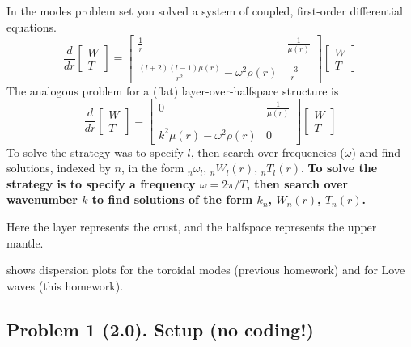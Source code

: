 \documentclass[11pt,titlepage,fleqn]{article}
\begin{document}
In the modes problem set you solved a system of coupled, first-order differential equations.
%
\begin{equation}
\frac{d}{dr}
\left[ \begin{array}{c} W \\ T \end{array} \right]
=
\left[ \begin{array}{cc}
\frac{1}{r} & \frac{1}{\mu(r)} \\
& \\
\frac{(l+2)(l-1)\mu(r)}{r^2} -\omega^2\rho(r)  & \frac{-3}{r}
\end{array} \right]
\left[ \begin{array}{c} W \\ T \end{array} \right]
\label{ODEs}
\end{equation}
%
The analogous problem for a (flat) layer-over-halfspace structure is
%
\begin{equation}
\frac{d}{dr}
\left[ \begin{array}{c} W \\ T \end{array} \right]
=
\left[ \begin{array}{cc}
0 & \frac{1}{\mu(r)} \\
& \\
k^2 \mu(r)-\omega^2\rho(r) & 0
\end{array} \right]
\left[ \begin{array}{c} W \\ T \end{array} \right]
\label{rODEs}
\end{equation}
%
To solve  the strategy was to specify $l$, then search over frequencies ($\omega$) and find solutions, indexed by $n$, in the form $_n\omega_l$, $_nW_l(r)$, $_nT_l(r)$. {\bf To solve  the strategy is to specify a frequency $\omega = 2\pi/T$, then search over wavenumber $k$ to find solutions of the form $k_n$, $W_n(r)$, $T_n(r)$.}

Here the layer represents the crust, and the halfspace represents the upper mantle.

 shows dispersion plots for the toroidal modes (previous homework) and for Love waves (this homework).


\subsection*{Problem 1 (2.0). Setup (no coding!)}
\end{document}
